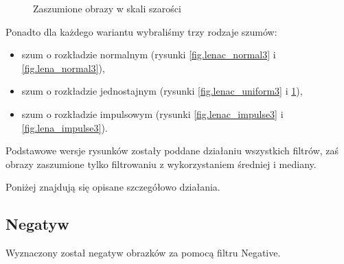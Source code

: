 \documentclass{classrep}
\begin{document}
\begin{figure}
{{  \label{fig.lena_uniform3}
 }
}
\caption{Zaszumione obrazy w skali szarości}
\end{figure}

Ponadto dla każdego wariantu wybraliśmy trzy rodzaje szumów:
\begin{itemize}
 \item szum o rozkładzie normalnym (rysunki \ref{fig.lenac_normal3} i \ref{fig.lena_normal3}),
 \item szum o rozkładzie jednostajnym (rysunki \ref{fig.lenac_uniform3} i \ref{fig.lena_uniform3}),
 \item szum o rozkładzie impulsowym (rysunki \ref{fig.lenac_impulse3} i \ref{fig.lena_impulse3}).
\end{itemize}

Podstawowe wersje rysunków zostały poddane działaniu wszystkich filtrów, zaś obrazy zaszumione tylko filtrowaniu z wykorzystaniem średniej i mediany.

Poniżej znajdują się opisane szczegółowo działania.

\subsection{Negatyw}
\label{sec.tests.negative}
Wyznaczony został negatyw obrazków za pomocą filtru Negative.
\end{document}
